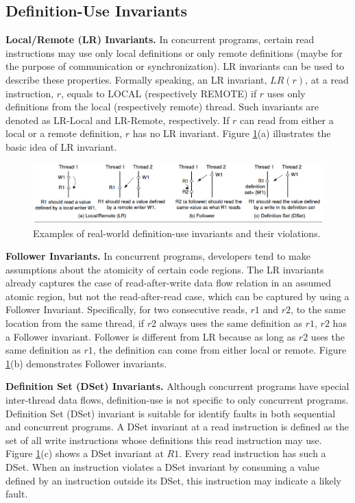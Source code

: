 \subsection{Definition-Use Invariants}
\textbf{Local/Remote (LR) Invariants.} In concurrent programs, certain read instructions may use only local definitions or only remote definitions (maybe for the purpose of communication or synchronization). LR invariants can be used to describe these properties. Formally speaking, an LR invariant, $LR(r)$, at a read instruction, $r$, equals to LOCAL (respectively REMOTE) if $r$ uses only definitions from the local (respectively remote) thread. Such invariants are denoted as LR-Local and LR-Remote, respectively. If $r$ can read from either a local or a remote definition, $r$ has no LR invariant. Figure \ref{fig:invariants}(a) illustrates the basic idea of LR invariant.

\begin{figure}
\centering
\includegraphics[scale=0.5,clip]{fig/invariants.eps} 
\caption{\label{fig:invariants}Examples of real-world definition-use invariants and their violations.} 
\end{figure}

\textbf{Follower Invariants.} In concurrent programs, developers tend to make assumptions about the atomicity of certain code regions. The LR invariants already captures the case of read-after-write data flow relation in an assumed atomic region, but not the read-after-read case, which can be captured by using a Follower Invariant. Specifically, for two consecutive reads, $r1$ and $r2$, to the same location from the same thread, if $r2$ always uses the same definition as $r1$, $r2$ has a Follower invariant. Follower is different from LR because as long as $r2$ uses the same definition as $r1$, the definition can come from either local or remote. Figure \ref{fig:invariants}(b) demonstrates Follower invariants.

\textbf{Definition Set (DSet) Invariants.} Although concurrent programs have special inter-thread data flows, definition-use is not specific to only concurrent programs. Definition Set (DSet) invariant is suitable for identify faults in both sequential and concurrent programs. A DSet invariant at a read instruction is defined as the set of all write instructions whose definitions this read instruction may use. Figure \ref{fig:invariants}(c) shows a DSet invariant at $R1$. Every read instruction has such a DSet. When an instruction violates a DSet invariant by consuming a value defined by an instruction outside its DSet, this instruction may indicate a likely fault.


